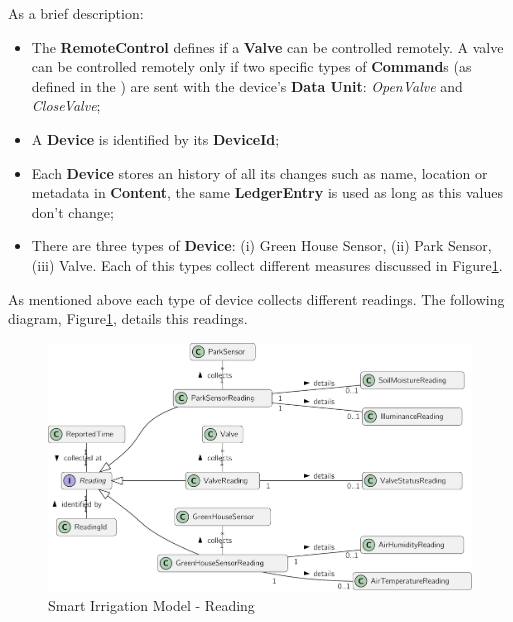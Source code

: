 As a brief description:

\begin{itemize}
   \item The \textbf{RemoteControl} defines if a \textbf{Valve} can be controlled remotely. A valve can be controlled remotely only if two specific types of \textbf{Command}s (as defined in the ) are sent with the device's \textbf{Data Unit}: \textit{OpenValve} and \textit{CloseValve};
   \item A \textbf{Device} is identified by its \textbf{DeviceId};
   \item Each \textbf{Device} stores an history of all its changes such as name, location or metadata in \textbf{Content}, the same \textbf{LedgerEntry} is used as long as this values don't change;
   \item There are three types of \textbf{Device}: (i) Green House Sensor, (ii) Park Sensor, (iii) Valve. Each of this types collect different measures discussed in Figure\ref{fig:design:domain:bounded_contexts:irrigation:diagram:reading}.
\end{itemize}

As mentioned above each type of device collects different readings. The following diagram, Figure\ref{fig:design:domain:bounded_contexts:irrigation:diagram:reading}, details this readings.

\begin{figure}[H]
  \centering
  \includegraphics[page=1,width=\columnwidth]{assets/diagrams/design/domain/smart-irrigation-model-4.pdf}
  \caption[Smart Irrigation Model - Reading]{Smart Irrigation Model - Reading}
  \label{fig:design:domain:bounded_contexts:irrigation:diagram:reading}
\end{figure}

